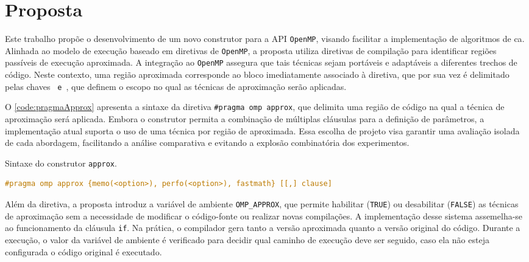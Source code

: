 \chapter{Proposta}\label{cap:proposta}

Este trabalho propõe o desenvolvimento de um novo construtor para a API \texttt{OpenMP}, visando facilitar a implementação de algoritmos de \gls{ca}. Alinhada ao modelo de execução baseado em diretivas de \texttt{OpenMP}, a proposta utiliza diretivas de compilação para identificar regiões passíveis de execução aproximada. A integração ao \texttt{OpenMP} assegura que tais técnicas sejam portáveis e adaptáveis a diferentes trechos de código. Neste contexto, uma região aproximada corresponde ao bloco imediatamente associado à diretiva, que por sua vez é delimitado pelas chaves \texttt{{} e \texttt{}}, que definem o escopo no qual as técnicas de aproximação serão aplicadas.

O \autoref{code:pragmaApprox} apresenta a sintaxe da diretiva \texttt{\#pragma omp approx}, que delimita uma região de código na qual a técnica de aproximação será aplicada. Embora o construtor permita a combinação de múltiplas cláusulas para a definição de parâmetros, a implementação atual suporta o uso de uma técnica por região de aproximada. Essa escolha de projeto visa garantir uma avaliação isolada de cada abordagem, facilitando a análise comparativa e evitando a explosão combinatória dos experimentos.

\begin{sourcecode}[htb]
    \caption{Sintaxe do construtor \texttt{approx}.}
    \label{code:pragmaApprox}
    \begin{lstlisting}[frame=single, language=C++]
#pragma omp approx {memo(<option>), perfo(<option>), fastmath} [[,] clause]
    \end{lstlisting}
    \fonte{}
\end{sourcecode}

Além da diretiva, a proposta introduz a variável de ambiente \texttt{OMP\_APPROX}, que permite habilitar (\texttt{TRUE}) ou desabilitar (\texttt{FALSE}) as técnicas de aproximação sem a necessidade de modificar o código-fonte ou realizar novas compilações. A implementação desse sistema assemelha-se ao funcionamento da cláusula \texttt{if}. Na prática, o compilador gera tanto a versão aproximada quanto a versão original do código. Durante a execução, o valor da variável de ambiente é verificado para decidir qual caminho de execução deve ser seguido, caso ela não esteja configurada o código original é executado.

